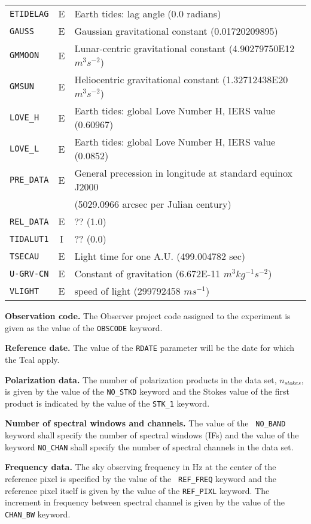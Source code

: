 \documentclass[twoside]{article}
\newcommand{\nstokes}{$n_{stokes}$}
\begin{document}
\begin{center}
\begin{tabular}{lcl}
{\tt ETIDELAG}  & E & Earth tides: lag angle (0.0 radians) \\
{\tt GAUSS}     & E & Gaussian gravitational constant (0.01720209895) \\
{\tt GMMOON}    & E & Lunar-centric gravitational constant (4.90279750E12 $m^3 s^{-2}$) \\
{\tt GMSUN}     & E & Heliocentric gravitational constant (1.32712438E20 $m^3 s^{-2}$)  \\
{\tt LOVE\_H}   & E & Earth tides: global Love Number H, IERS value (0.60967) \\
{\tt LOVE\_L}   & E & Earth tides: global Love Number H, IERS value (0.0852) \\
{\tt PRE\_DATA} & E & General precession in longitude at standard equinox J2000 \\
                &   & \hspace{1em} (5029.0966 arcsec per Julian century)\\
{\tt REL\_DATA} & E & ?? (1.0) \\
{\tt TIDALUT1}  & I & ?? (0.0) \\
{\tt TSECAU}    & E & Light time for one A.U. (499.004782 sec) \\
{\tt U-GRV-CN}  & E & Constant of gravitation (6.672E-11 $m^3 kg^{-1} s^{-2}$) \\
{\tt VLIGHT}    & E & speed of light (299792458 $m s^{-1}$)
\end{tabular}
\end{center}

{\bf Observation code.} The Observer project code assigned to the
experiment is given as the value of the {\tt OBSCODE} keyword.

{\bf Reference date.} The value of the {\tt RDATE} parameter will be
the date for which the Tcal apply.

{\bf Polarization data.} The number of polarization products in the
data set, \nstokes, is given by the value of the {\tt NO\_STKD}
keyword and the Stokes value of the first product is indicated by the
value of the {\tt STK\_1} keyword.

{\bf Number of spectral windows and channels.} The value of the {\tt
  NO\_BAND} keyword shall specify the number of spectral windows (IFs)
and the value of the keyword {\tt NO\_CHAN} shall specify the number
of spectral channels in the data set.

{\bf Frequency data.} The sky observing frequency in Hz at the
center of the reference pixel is specified by the value of the {\tt
  REF\_FREQ} keyword and the reference pixel itself is given by the
value of the {\tt REF\_PIXL} keyword.  The increment in frequency
between spectral channel is given by the value of the {\tt CHAN\_BW}
keyword.
\end{document}
